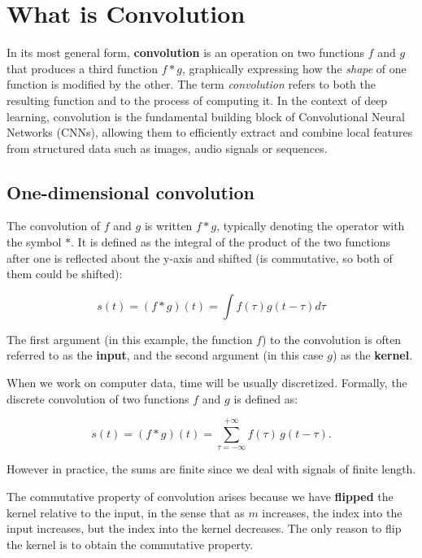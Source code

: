 \chapter{What is Convolution}
\label{ch:what-is-conv}%

In its most general form, \textbf{convolution} is an operation on two functions $f$ and $g$ that produces a third function $f*g$, graphically expressing how the \textit{shape} of one function is modified by the other. The term \textit{convolution} refers to both the resulting function and to the process of computing it. In the context of deep learning, convolution is the fundamental building block of Convolutional Neural Networks (CNNs), allowing them to efficiently extract and combine local features from structured data such as images, audio signals or sequences.

\clearpage

\section{One-dimensional convolution}

The convolution of $f$ and $g$ is written $f*g$, typically denoting the operator with the symbol $*$. It is defined as the integral of the product of the two functions after one is reflected about the y-axis and shifted (is commutative, so both of them could be shifted):

\begin{equation}
s(t)=(f * g)(t) = \int f(\tau)g(t-\tau)d\tau
\end{equation}

The first argument (in this example, the function $f$) to the convolution is often referred to as the \textbf{input}, and the second argument (in this case $g$) as the \textbf{kernel}.

When we work on computer data, time will be usually discretized. Formally, the discrete convolution of two functions $f$ and $g$ is defined as:

\begin{equation}
s(t)=(f * g)(t) = \sum_{\tau=-\infty}^{+\infty} f(\tau) \, g(t - \tau).
\end{equation}

However in practice, the sums are finite since we deal with signals of finite length.  

The commutative property of convolution arises because we have \textbf{flipped} the kernel relative to the input, in the sense that as $m$ increases, the index into the input increases, but the index into the kernel decreases. The only reason to flip the kernel is to obtain the commutative property. 

